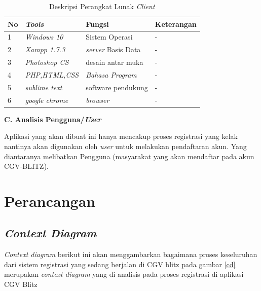 \begin{table}[!htbp]
\captionsetup{singlelinecheck=off}
\caption{Deskripsi Perangkat Lunak \textit{Client}}
\label{lunakclient}
\begin{tabular}{|l|l|l|l|}
\hline
No & \textit{Tools} & Fungsi & Keterangan \\
\hline

1 &  \textit{Windows 10} & Sistem Operasi  & -  \\

\hline

2 &  \textit{Xampp 1.7.3} & \textit{server} Basis Data & - \\
\hline

3 &  \textit{Photoshop CS} & desain antar muka & - \\
\hline

4 &  \textit{PHP,HTML,CSS} & \textit{Bahasa Program} & -  \\    
\hline

5 & \textit{sublime text} & software pendukung & - \\
\hline

6 & \textit{google chrome} & \textit{browser} & - \\
\hline
\end{tabular}
\end{table}

\textbf{C.	Analisis Pengguna/\textit{User}}
\par
Aplikasi yang akan dibuat ini hanya mencakup proses registrasi yang kelak nantinya akan digunakan oleh \textit{user} untuk melakukan pendaftaran akun. Yang diantaranya melibatkan Pengguna (masyarakat yang akan mendaftar pada akun CGV-BLITZ).

\section{Perancangan}
\subsection{\textit{Context Diagram}}
\par
\textit{Context diagram} berikut ini akan menggambarkan bagaimana proses keseluruhan dari sistem registrasi yang sedang berjalan di CGV blitz
pada gambar \ref{cd} merupakan \textit{context diagram} yang di analisis pada proses registrasi di aplikasi CGV Blitz

